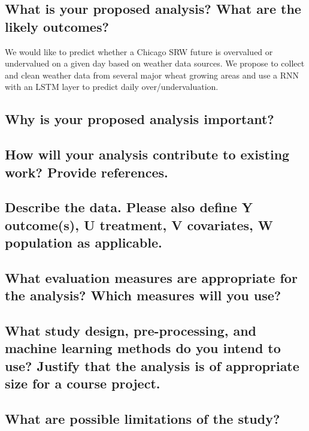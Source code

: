 \documentclass[twoside,11pt]{article}
\begin{document}
\subsection{What is your proposed analysis? What are the likely outcomes?}

We would like to predict whether a Chicago SRW future is overvalued or undervalued on a given day based on weather data sources. We propose to collect and clean weather data from several major wheat growing areas and use a RNN with an LSTM layer to predict daily over/undervaluation.  

\subsection{Why is your proposed analysis important?}


\subsection{How will your analysis contribute to existing work? Provide references.}


\subsection{Describe the data. Please also define Y outcome(s), U treatment, V covariates, W population as applicable.}


\subsection{What evaluation measures are appropriate for the analysis? Which measures will you use?}


\subsection{What study design, pre-processing, and machine learning methods do you intend to use? Justify that the analysis is of appropriate size for a course project.}


\subsection{What are possible limitations of the study?}



\end{document}
